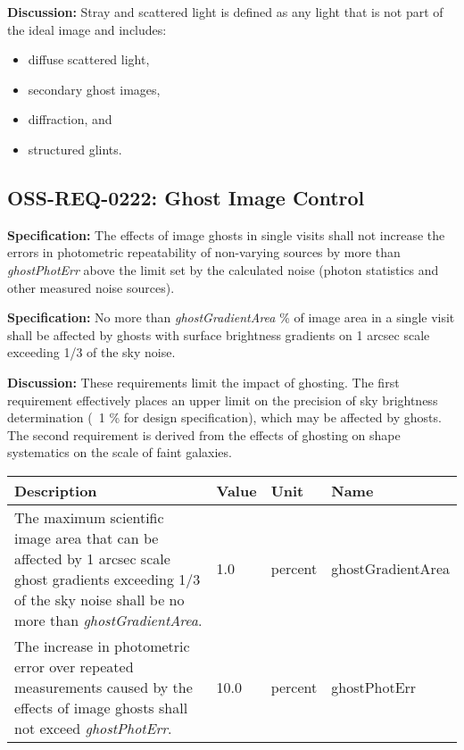 \documentclass[SE,authoryear,toc]{lsstdoc}
\begin{document}
\textbf{Discussion:} Stray and scattered light is defined as any light that is not part of the ideal image and includes:
\begin{itemize}
    \item diffuse scattered light,
    \item secondary ghost images,
    \item diffraction, and
    \item structured glints.
\end{itemize}

\subsection{OSS-REQ-0222: Ghost Image Control}  \label{sec:ghosts}

\textbf{Specification:} The effects of image ghosts in single visits shall not increase the errors in photometric repeatability of non-varying sources by more than \textit{ghostPhotErr} above the limit set by the calculated noise (photon statistics and other measured noise sources). 

\textbf{Specification:} No more than \textit{ghostGradientArea} \% of image area in a single visit shall be affected by ghosts with surface brightness gradients on 1 arcsec scale exceeding 1/3 of the
sky noise.

\textbf{Discussion:} These requirements limit the impact of ghosting. The first requirement effectively places an upper limit on the precision of sky brightness determination (~1 \% for design specification), which may be affected by ghosts. The second requirement is derived from the effects of ghosting on shape systematics on the scale of faint galaxies.

\begin{center}
\begin{tabular}{p{}p{}p{}p{}}\hline
    \textbf{Description} & \textbf{Value} & \textbf{Unit} & \textbf{Name} \\\hline
    The maximum scientific image area that can be affected by 1 arcsec scale ghost gradients exceeding 1/3 of the sky noise shall be no more than \textit{ghostGradientArea}. & 1.0 & percent & ghostGradientArea \\\hline
    The increase in photometric error over repeated measurements caused by the effects of image ghosts shall not exceed \textit{ghostPhotErr}. & 10.0 & percent & ghostPhotErr \\\hline
\end{tabular}
\end{center}
\end{document}
